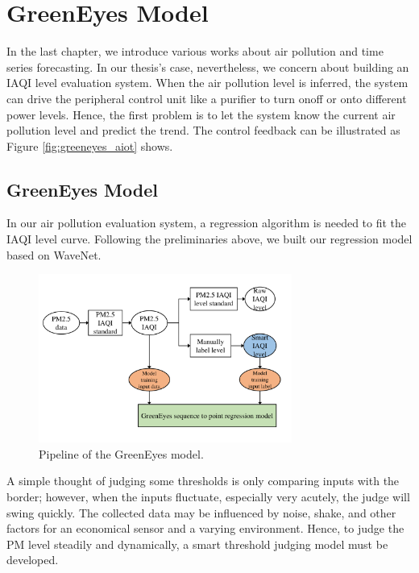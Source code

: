 \chapter{GreenEyes Model}\label{chap:greeneyes_model}

In the last chapter, we introduce various works about air pollution and time series forecasting. In our thesis's case, nevertheless, we concern about building an IAQI level evaluation system. When the air pollution level is inferred, the system can drive the peripheral control unit like a purifier to turn on\/off or onto different power levels. Hence, the first problem is to let the system know the current air pollution level and predict the trend. The control feedback can be illustrated as Figure \ref{fig:greeneyes_aiot} shows.

\section{GreenEyes Model}

In our air pollution evaluation system, a regression algorithm is needed to fit the IAQI level curve. Following the preliminaries above, we built our regression model based on WaveNet.

\begin{figure}[!htbp]
    \centering
    \includegraphics[width=8.3cm]{graphs/greeneyes_pipeline.pdf}
    \caption{Pipeline of the GreenEyes model.}
    \label{fig:greeneyes_pipeline}
\end{figure}

A simple thought of judging some thresholds is only comparing inputs with the border; however, when the inputs fluctuate, especially very acutely, the judge will swing quickly. The collected data may be influenced by noise, shake, and other factors for an economical sensor and a varying environment. Hence, to judge the PM level steadily and dynamically, a smart threshold judging model must be developed. 

